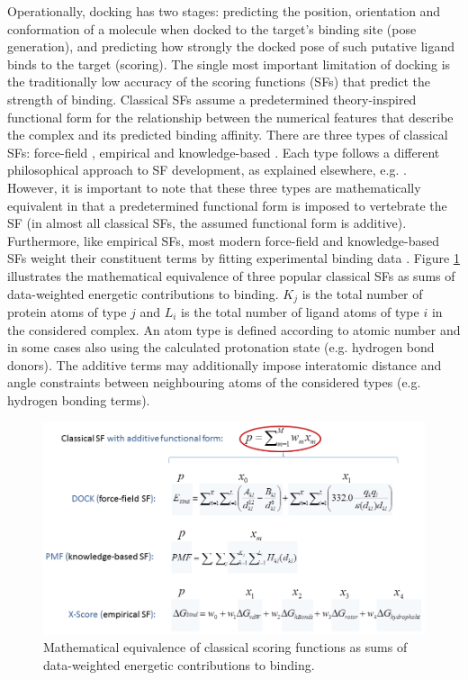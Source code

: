 Operationally, docking has two stages: predicting the position, orientation and conformation of a molecule when docked to the target's binding site (pose generation), and predicting how strongly the docked pose of such putative ligand binds to the target (scoring).  The single most important limitation of docking is the traditionally low accuracy of the scoring functions (SFs) that predict the strength of binding. Classical SFs assume a predetermined theory-inspired functional form for the relationship between the numerical features that describe the complex and its predicted binding affinity. There are three types of classical SFs: force-field \citep{1461,1462,959}, empirical \citep{1463,1464,1465,1466} and knowledge-based \citep{1467,1468,1469,1470}. Each type follows a different philosophical approach to SF development, as explained elsewhere, e.g. \citep{579}. However, it is important to note that these three types are mathematically equivalent in that a predetermined functional form is imposed to vertebrate the SF (in almost all classical SFs, the assumed functional form is additive). Furthermore, like empirical SFs, most modern force-field and knowledge-based SFs weight their constituent terms by fitting experimental binding data \citep{579}. Figure \ref{rfscore3:ClassicalScoringFunctions} illustrates the mathematical equivalence of three popular classical SFs as sums of data-weighted energetic contributions to binding. $K_j$ is the total number of protein atoms of type $j$ and $L_i$ is the total number of ligand atoms of type $i$ in the considered complex. An atom type is defined according to atomic number and in some cases also using the calculated protonation state (e.g. hydrogen bond donors). The additive terms may additionally impose interatomic distance and angle constraints between neighbouring atoms of the considered types (e.g. hydrogen bonding terms).

\begin{figure}
\centering
\includegraphics[width=\linewidth]{../rfscore3/ClassicalScoringFunctions.png}
\caption{Mathematical equivalence of classical scoring functions as sums of data-weighted energetic contributions to binding.}
\label{rfscore3:ClassicalScoringFunctions}
\end{figure}

